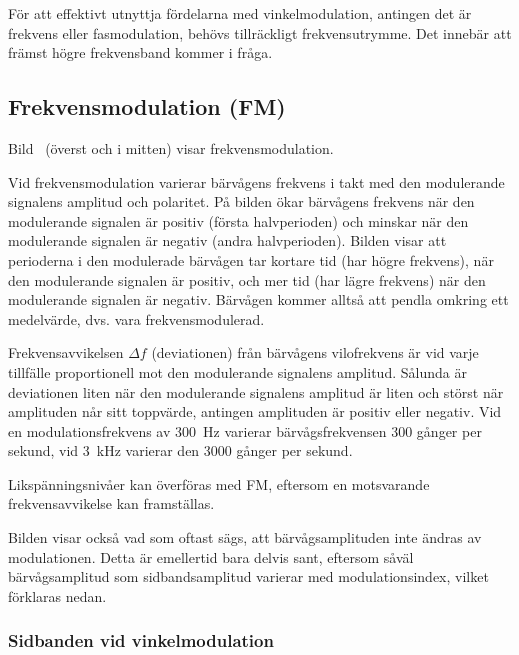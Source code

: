 För att effektivt utnyttja fördelarna med vinkelmodulation, antingen det är
frekvens eller fasmodulation, behövs tillräckligt frekvensutrymme.
Det innebär att främst högre frekvensband kommer i fråga.

\newpage
\subsection{Frekvensmodulation (FM)}
\label{modulation_fm}


Bild~ (överst och i mitten) visar frekvensmodulation.

Vid frekvensmodulation varierar bärvågens frekvens i takt med den modulerande
signalens amplitud och polaritet.
På bilden ökar bärvågens frekvens när den modulerande signalen är positiv
(första halvperioden) och minskar när den modulerande signalen är negativ
(andra halvperioden).
Bilden visar att perioderna i den modulerade bärvågen tar kortare tid (har
högre frekvens), när den modulerande signalen är positiv, och mer tid (har lägre
frekvens) när den modulerande signalen är negativ.
Bärvågen kommer alltså att pendla omkring ett medelvärde, dvs. vara
frekvensmodulerad.

Frekvensavvikelsen \(\Delta f\) (deviationen) från bärvågens vilofrekvens är
vid varje tillfälle proportionell mot den modulerande signalens amplitud.
Sålunda är deviationen liten när den modulerande signalens amplitud är liten
och störst när amplituden når sitt toppvärde, antingen amplituden är positiv
eller negativ.
Vid en modulationsfrekvens av \qty{300}{\hertz} varierar bärvågsfrekvensen 300
gånger per sekund, vid \qty{3}{\kilo\hertz} varierar den 3000 gånger per sekund.

Likspänningsnivåer kan överföras med FM, eftersom en motsvarande
frekvensavvikelse kan framställas.

Bilden visar också vad som oftast sägs, att bärvågsamplituden inte ändras av
modulationen.
Detta är emellertid bara delvis sant, eftersom såväl bärvågsamplitud som
sidbandsamplitud varierar med modulationsindex, vilket förklaras nedan.

\subsubsection{Sidbanden vid vinkelmodulation}

